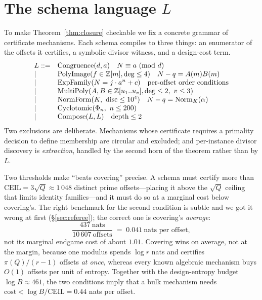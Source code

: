 \section{The schema language \texorpdfstring{$L$}{L}}\label{sec:grammar}

To make Theorem~\ref{thm:closure} checkable we fix a concrete grammar of
certificate mechanisms. Each schema compiles to three things: an enumerator of
the offsets it certifies, a symbolic divisor witness, and a design-cost term.
\[
\begin{array}{ll}
L::= & \mathrm{Congruence}(d,a)\quad \N\equiv a\ (\mathrm{mod}\ d)\\
   |\ & \mathrm{PolyImage}(f\in\mathbb Z[m],\deg\le4)\quad \N-q=A(m)B(m)\\
   |\ & \mathrm{ExpFamily}(\N=j\cdot a^{n}+c)\quad\text{per-offset order conditions}\\
   |\ & \mathrm{MultiPoly}(A,B\in\mathbb Z[u_1..u_v],\deg\le2,\ v\le3)\\
   |\ & \mathrm{NormForm}(K,\ \mathrm{disc}\le10^{4})\quad \N-q=\mathrm{Norm}_K(\alpha)\\
   |\ & \mathrm{Cyclotomic}(\Phi_n,\ n\le200)\\
   |\ & \mathrm{Compose}(L,L)\quad\text{depth}\le2
\end{array}
\]
Two exclusions are deliberate. Mechanisms whose certificate requires a
primality decision to define membership are circular and excluded; and
per-instance divisor discovery is \emph{extraction}, handled by the second horn
of the theorem rather than by $L$.

Two thresholds make ``beats covering'' precise. A schema must certify more than
$\mathrm{CEIL}=3\sqrt{Q}\approx1\,048$ distinct prime offsets---placing it above
the $\sqrt{Q}$ ceiling that limits identity families---and it must do so at a
marginal cost below covering's. The right benchmark for the second condition is
subtle and we got it wrong at first (\S\ref{sec:referee}); the correct one is
covering's \emph{average}:
\[
\frac{437\ \text{nats}}{10\,607\ \text{offsets}}\;=\;0.041\ \text{nats per offset},
\]
not its marginal endgame cost of about $1.01$. Covering wins on average, not at
the margin, because one modulus spends $\log r$ nats and certifies
$\pi(Q)/(r-1)$ offsets \emph{at once}, whereas every known algebraic mechanism
buys $O(1)$ offsets per unit of entropy. Together with the design-entropy budget
$\log B\approx461$, the two conditions imply that a bulk mechanism needs
$\mathrm{cost}<\log B/\mathrm{CEIL}=0.44$ nats per offset.

